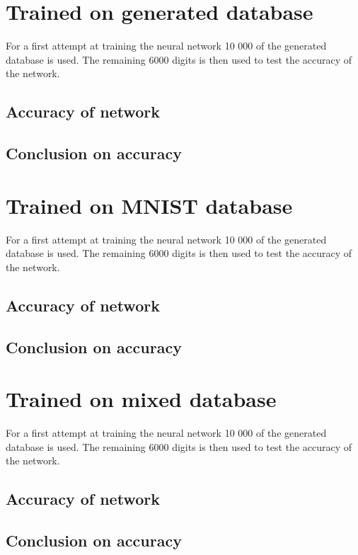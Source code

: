 \section{Trained on generated database}
For a first attempt at training the neural network 10 000 of the generated database is used. The remaining 6000 digits is then used to test the accuracy of the network.

\subsection{Accuracy of network}

\subsection{Conclusion on accuracy}

\section{Trained on MNIST database}
For a first attempt at training the neural network 10 000 of the generated database is used. The remaining 6000 digits is then used to test the accuracy of the network.

\subsection{Accuracy of network}

\subsection{Conclusion on accuracy}


\section{Trained on mixed database}
For a first attempt at training the neural network 10 000 of the generated database is used. The remaining 6000 digits is then used to test the accuracy of the network.

\subsection{Accuracy of network}

\subsection{Conclusion on accuracy}

